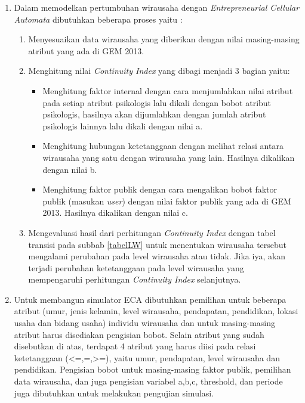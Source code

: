\begin{enumerate}
	\item Dalam memodelkan pertumbuhan wirausaha dengan \textit{Entrepreneurial Cellular Automata} dibutuhkan beberapa proses yaitu :
	\begin{enumerate}
		\item Menyesuaikan data wirausaha yang diberikan dengan nilai masing-masing atribut yang ada di GEM 2013.
		\item Menghitung nilai \textit{Continuity Index} yang dibagi menjadi 3 bagian yaitu:
		\begin{itemize}
			\item Menghitung faktor internal dengan cara menjumlahkan nilai atribut pada setiap atribut psikologis lalu dikali dengan bobot atribut psikologis, hasilnya akan dijumlahkan dengan jumlah atribut psikologis lainnya lalu dikali dengan nilai a.
			\item Menghitung hubungan ketetanggaan dengan melihat relasi antara wirausaha yang satu dengan wirausaha yang lain. Hasilnya dikalikan dengan nilai b.
			\item Menghitung faktor publik dengan cara mengalikan bobot faktor publik (masukan \textit{user}) dengan nilai faktor publik yang ada di GEM 2013. Hasilnya dikalikan dengan nilai c.
		\end{itemize}
		\item Mengevaluasi hasil dari perhitungan \textit{Continuity Index} dengan tabel transisi pada subbab \ref{tabelLW} untuk menentukan wirausaha tersebut mengalami perubahan pada level wirausaha atau tidak. Jika iya, akan terjadi perubahan ketetanggaan pada level wirausaha yang mempengaruhi perhitungan \textit{Continuity Index} selanjutnya.
	\end{enumerate}
	\item Untuk membangun simulator ECA dibutuhkan pemilihan untuk beberapa atribut (umur, jenis kelamin, level wirausaha, pendapatan, pendidikan, lokasi usaha dan bidang usaha) individu wirausaha dan untuk masing-masing atribut harus disediakan pengisian bobot. Selain atribut yang sudah disebutkan di atas, terdapat 4 atribut yang harus diisi pada relasi ketetanggaan (<=,=,>=), yaitu umur, pendapatan, level wirausaha dan pendidikan. Pengisian bobot untuk masing-masing faktor publik, pemilihan data wirausaha, dan juga pengisian variabel a,b,c, threshold, dan periode juga dibutuhkan untuk melakukan pengujian simulasi.
\end{enumerate}

